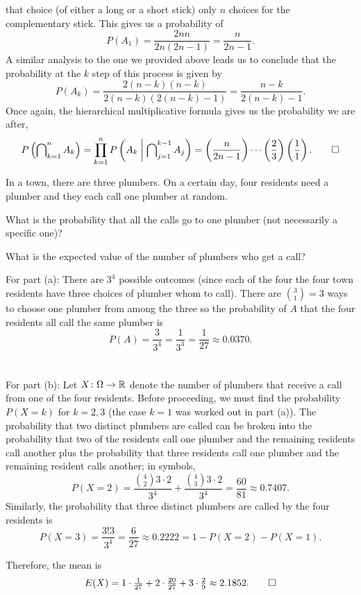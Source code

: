 \begin{solution*}
  that choice (of either a long or a short stick) only \(n\) choices for
  the complementary stick. This gives us a probability of
  \[
    P(A_1)=\frac{2nn}{2n(2n-1)}=\frac{n}{2n-1}.
  \]
  A similar analysis to the one we provided above leads us to conclude that
  the probability at the \(k\) step of this process is given by
  \[
    P(A_k)=\frac{2(n-k)(n-k)}{2(n-k)(2(n-k)-1)}=\frac{n-k}{2(n-k)-1}.
  \]
  Once again, the hierarchical multiplicative formula gives us the
  probability we are after,
  \[
    P\left(\bigcap\nolimits_{k=1}^n A_k\right)=%
    \prod_{k=1}^n
    P\left(A_k\relmiddle|\bigcap\nolimits_{j=1}^{k-1}A_j\right)=%
    \left(\frac{n}{2n-1}\right)\dotsm
    \left(\frac{2}{3}\right)\left(\frac{1}{1}\right).\qedhere
  \]
\end{solution*}

\begin{problem}[Handout 3, \# 5]
  In a town, there are three plumbers. On a certain day, four residents
  need a plumber and they each call one plumber at random.
  \begin{alphlist}
  \item What is the probability that all the calls go to one plumber (not
    necessarily a specific one)?
  \item What is the expected value of the number of plumbers who get a
    call?
  \end{alphlist}
\end{problem}
\begin{solution*}
  For part (a): There are \(3^4\) possible outcomes (since each of the four
  the four town residents have three choices of plumber whom to
  call). There are \(\binom{3}{1}=3\) ways to choose one plumber from among
  the three so the probability of \(A\) that the four residents all call
  the same plumber is
  \[
    P(A)=\frac{3}{3^4}=%
    \frac{1}{3^3}=%
    \frac{1}{27}\approx%
    0.0370.
  \]
  \\\\
  For part (b): Let \(X\colon\Omega\to\mathbb{R}\) denote the number of plumbers
  that receive a call from one of the four residents. Before proceeding, we
  must find the probability \(P(X=k)\) for \(k=2,3\) (the case \(k=1\) was
  worked out in part (a)). The probability that two distinct plumbers are
  called can be broken into the probability that two of the residents call
  one plumber and the remaining residents call another plus the probability
  that three residents call one plumber and the remaining resident calls
  another; in symbols,
  \[
    P(X=2)=%
    \frac{\binom{4}{2}3\cdot 2}{3^4}+\frac{\binom{4}{3}3\cdot 2}{3^4}=%
    \frac{60}{81}\approx0.7407.
  \]
  Similarly, the probability that three distinct plumbers are called by the
  four residents is
  \[
    P(X=3)=%
    \frac{3!3}{3^4}=\frac{6}{27}\approx%
    0.2222=%
    1-P(X=2)-P(X=1).
  \]

  Therefore, the mean is
  \[
    E(X) =1\cdot\tfrac{1}{27}+2\cdot\tfrac{20}{27}+3\cdot\tfrac{2}{9}
    \approx 2.1852.\qedhere
  \]
\end{solution*}

